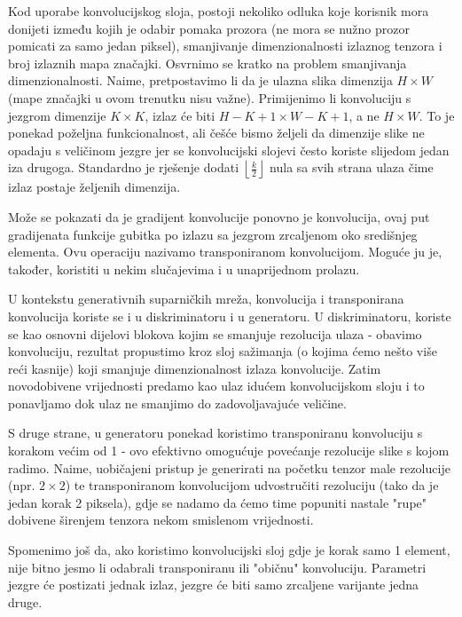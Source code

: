 Kod uporabe konvolucijskog sloja, postoji nekoliko odluka koje korisnik mora donijeti između kojih je odabir pomaka prozora (ne mora se nužno prozor pomicati za samo jedan piksel), smanjivanje dimenzionalnosti izlaznog tenzora i broj izlaznih mapa značajki. Osvrnimo se kratko na problem smanjivanja dimenzionalnosti. Naime, pretpostavimo li da je ulazna slika dimenzija $H \times W$ (mape značajki u ovom trenutku nisu važne). Primijenimo li konvoluciju s jezgrom dimenzije $K \times K$, izlaz će biti $H - K +  1 \times W - K + 1$, a ne $H \times W$. To je ponekad poželjna funkcionalnost, ali češće bismo željeli da dimenzije slike ne opadaju s veličinom jezgre jer se konvolucijski slojevi često koriste slijedom jedan iza drugoga. Standardno je rješenje dodati $\left \lfloor \frac{k}{2} \right \rfloor$ nula sa svih strana ulaza čime izlaz postaje željenih dimenzija.

Može se pokazati da je gradijent konvolucije ponovno je konvolucija, ovaj put gradijenata funkcije gubitka po izlazu sa jezgrom zrcaljenom oko središnjeg elementa. Ovu operaciju nazivamo transponiranom konvolucijom. Moguće ju je, također, koristiti u nekim slučajevima i u unaprijednom prolazu.

U kontekstu generativnih suparničkih mreža, konvolucija i transponirana konvolucija koriste se i u diskriminatoru i u generatoru. U diskriminatoru, koriste se kao osnovni dijelovi blokova kojim se smanjuje rezolucija ulaza - obavimo konvoluciju, rezultat propustimo kroz sloj sažimanja (o kojima ćemo nešto više reći kasnije) koji smanjuje dimenzionalnost izlaza konvolucije. Zatim novodobivene vrijednosti predamo kao ulaz idućem konvolucijskom sloju i to ponavljamo dok ulaz ne smanjimo do zadovoljavajuće veličine. 

S druge strane, u generatoru ponekad koristimo transponiranu konvoluciju s korakom većim od 1 - ovo efektivno omogućuje povećanje rezolucije slike s kojom radimo. Naime, uobičajeni pristup je generirati na početku tenzor male rezolucije (npr. $2 \times 2$) te transponiranom konvolucijom udvostručiti rezoluciju (tako da je jedan korak 2 piksela), gdje se nadamo da ćemo time popuniti nastale "rupe" dobivene širenjem tenzora nekom smislenom vrijednosti. 

Spomenimo još da, ako koristimo konvolucijski sloj gdje je korak samo 1 element, nije bitno jesmo li odabrali transponiranu ili "običnu" konvoluciju. Parametri jezgre će postizati jednak izlaz, jezgre će biti samo zrcaljene varijante jedna druge. 


